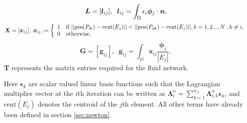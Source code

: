   \begin{equation*}
  \mathbf{L}=[\mathbf{l}_{ij}], \;\; \mathbf{l}_{ij}=\int_{\Omega} {\epsilon}_{i}  \mathbf{\phi}_{j} \cdot \normal,
 \end{equation*}
\begin{equation*}
\mathbf{X}=[\mathbf{x}_{ij}], \; \mathbf{x}_{ij} := \left\lbrace
  \begin{array}{l l}
    1 &  \text{if $||\mbox{pos}(P_{di}) - \mbox{cent}(E_{j}) || <  ||\mbox{pos}(P_{dk}) - \mbox{cent}(E_{j}) ||, k=1,2...,N \;, k \neq i $},\\
    0 &  \text{otherwise},
  \end{array} \right.
\end{equation*}
 \begin{equation*}
  \mathbf{G}=[\mathbf{g}_{ij}], \;\; \mathbf{g}_{ij}=\int_{\Omega} \mathbf{x}_{ij}   \frac{ \mathbf{\phi}_{j}}{|E_{j}|},
 \end{equation*}
$\mathbf{T}$ represents the matrix entries required for the fluid network.\newline

Here $\boldsymbol{\epsilon}_{k}$ are scalar valued linear basis functions such that the Lagrangian multiplier vector at the $i$th iteration can be written as $\boldsymbol{\Lambda}^{n}_{i}= \sum_{k=1}^{n_{\Lambda}}\boldsymbol{\Lambda}^{n}_{i,k}\boldsymbol{\epsilon}_{k}$, and $\mbox{cent}(E_{j})$ denotes the centroid of the $j$th element. All other terms have already been defined in section \ref{sec:newton}.


